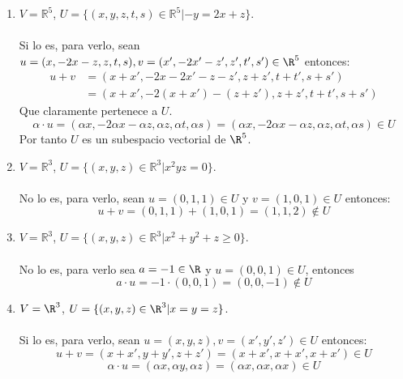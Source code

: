 \begin{ejercicio}
\begin{enumerate}
		\item $V = \mathbb{R}^5$, $U = \{(x,y,z,t,s) \in \mathbb{R}^5 | -y = 2x + z\}$.
		      \\ \\Si lo es, para verlo, sean $u = (x, -2x-z, z, t, s), v = (x', -2x'-z', z', t', s') \in \R^5$ entonces:
		      \begin{align*}
			      u + v &= (x + x', -2x - 2x' - z - z', z + z', t + t', s + s') \\&= (x + x', -2(x + x') - (z + z'), z + z', t + t', s + s')
		      \end{align*}
		      Que claramente pertenece a $U$.
		      \begin{equation*}
			      \alpha \cdot u = (\alpha x, -2\alpha x - \alpha z, \alpha z, \alpha t, \alpha s) = (\alpha x, -2\alpha x - \alpha z, \alpha z, \alpha t, \alpha s) \in U
		      \end{equation*}
		      Por tanto $U$ es un subespacio vectorial de $\R^5$.
		\item $V = \mathbb{R}^3$, $U = \{(x,y,z) \in \mathbb{R}^3 | x^2 yz = 0\}$.
		      \\ \\No lo es, para verlo, sean $ u = (0,1,1) \in U $ y $ v = (1,0,1) \in U $ entonces:
		      \begin{equation*}
			      u + v = (0,1,1) + (1,0,1) = (1,1,2) \notin U
		      \end{equation*}
		\item $V = \mathbb{R}^3$, $U = \{(x,y,z) \in \mathbb{R}^3 | x^2 + y^2 + z \geq 0\}$.
		      \\ \\No lo es, para verlo sea $a = -1 \in \R$ y $u = (0,0,1) \in U$, entonces
		      \begin{equation*}
			      a \cdot u = -1 \cdot (0,0,1) = (0,0,-1) \notin U
		      \end{equation*}
		\item $V = \R^3$, $U = \{(x,y,z) \in \R^3 | x = y = z\}$.
		      \\ \\Si lo es, para verlo, sean $u = (x,y,z), v = (x',y',z') \in U$ entonces:
		      \begin{equation*}
			      u + v = (x + x', y + y', z + z') = (x + x', x + x', x + x') \in U
		      \end{equation*}
		      \begin{equation*}
			      \alpha \cdot u = (\alpha x, \alpha y, \alpha z) = (\alpha x, \alpha x, \alpha x) \in U
		      \end{equation*}

\end{enumerate}
\end{ejercicio}
